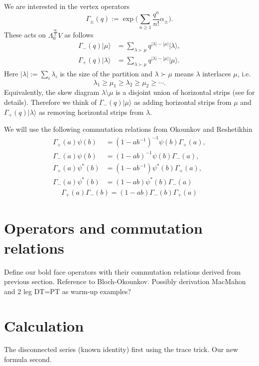 \documentclass{amsart}
\theoremstyle{definition}
\begin{document}
We are interested in the vertex operators
$$
\Gamma_{\pm}(q) := \exp \Big( \sum_{n \geq 1} \frac{q^n}{n!} \alpha_\pm \Big).
$$
These acts on $\Lambda^{\frac{\infty}{2}}_{0} V$ as follows
\begin{align*}
\Gamma_-(q) |\mu \rangle &= \sum_{\lambda \succ \mu} q^{|\lambda| - |\mu|} |\lambda \rangle, \\ 
\Gamma_+(q) | \lambda \rangle &= \sum_{\lambda \succ \mu} q^{|\lambda| - |\mu|} |\mu \rangle.
\end{align*}
Here $|\lambda|:=\sum_i \lambda_i$ is the size of the partition and $\lambda \succ \mu$ means $\lambda$ interlaces $\mu$, i.e.
$$
\lambda_1 \geq \mu_1 \geq \lambda_2 \geq \mu_2 \geq \cdots.
$$
Equivalently, the skew diagram $\lambda \setminus \mu$ is a disjoint union of horizontal strips (see \cite{You} for details). Therefore we think of $\Gamma_-(q) |\mu\rangle$ as adding horizontal strips from $\mu$ and $\Gamma_+(q) |\lambda\rangle$ as removing horizontal strips from $\lambda$. 

We will use the following commutation relations from Okounkov and Reshetikhin \cite{OR2}
\begin{align*}
\Gamma_+(a) \psi(b) &= (1-a b^{-1})^{-1} \psi(b) \Gamma_+(a), \\
\Gamma_-(a) \psi(b) &= (1-a b)^{-1} \psi(b) \Gamma_-(a), \\
\Gamma_+(a) \psi^*(b) &= (1-a b^{-1}) \psi^*(b) \Gamma_+(a), \\
\Gamma_-(a) \psi^*(b) &= (1-a b) \psi^*(b) \Gamma_-(a)
\end{align*}
\begin{align*}
\Gamma_+(a)\Gamma_-(b) = (1-ab) \Gamma_-(b)\Gamma_+(a)
\end{align*}


\section{Operators and commutation relations}

Define our bold face operators with their commutation relations derived from previous section. Reference to Bloch-Okounkov. Possibly derivation MacMahon and 2 leg DT=PT as warm-up examples?

\section{Calculation}

The disconnected series (known identity) first using the trace trick. Our new formula second.


     


\end{document}
